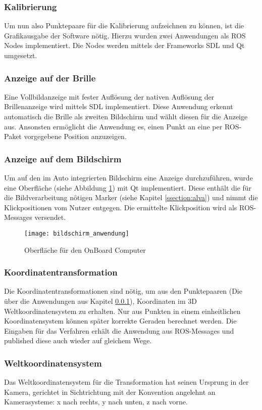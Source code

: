 \subsubsection{Kalibrierung}
\label{chap:punktepaare}
Um nun also Punktepaare für die Kalibrierung aufzeichnen zu können, ist die Grafikausgabe der Software nötig. Hierzu wurden zwei Anwendungen als ROS Nodes implementiert. Die Nodes werden mittels der Frameworks \ac{SDL}  \cite{sdl} und  \ac{Qt} \cite{qt} umgesetzt.
\subsubsection*{Anzeige auf der Brille}
Eine Vollbildanzeige mit fester Auflösung der nativen Auflösung der Brillenanzeige wird mittels SDL implementiert. Diese Anwendung erkennt automatisch die Brille als zweiten Bildschirm und wählt diesen für die Anzeige aus. Ansonsten ermöglicht die Anwendung es, einen Punkt an eine per ROS-Paket vorgegebene Position anzuzeigen.

\subsubsection*{Anzeige auf dem Bildschirm}
Um auf den im Auto integrierten Bildschirm eine Anzeige durchzuführen, wurde eine Oberfläche (siehe Abbildung \ref{fig:fensteranwendung}) mit Qt implementiert. Diese enthält die für die Bildverarbeitung nötigen Marker (siehe Kapitel \ref{ssection:alva}) und nimmt die Klickpositionen vom Nutzer entgegen. Die ermittelte Klickposition wird als ROS-Messages versendet.
\begin{figure}[h]
   \centering
   \texttt{[image: bildschirm\_anwendung]}
   \caption{Oberfläche für den OnBoard Computer}
   \label{fig:fensteranwendung}
\end{figure}


\subsubsection{Koordinatentransformation}
Die Koordinatentransformationen sind nötig, um aus den Punktepaaren (Die über die Anwendungen aus Kapitel \ref{chap:punktepaare}), Koordinaten im 3D Weltkoordinatensystem zu erhalten. Nur aus Punkten in einem einheitlichen Koordinatensystem können später korrekte Geraden berechnet werden.
Die Eingaben für das Verfahren erhält die Anwendung aus ROS-Messages und published diese auch wieder auf gleichem Wege.

\subsubsection*{Weltkoordinatensystem}
\label{sec:koord}
Das Weltkoordinatensystem für die Transformation hat seinen Ursprung in der Kamera, gerichtet in Sichtrichtung mit der Konvention angelehnt an Kamerasysteme: x nach rechts, y nach unten, z nach vorne.

